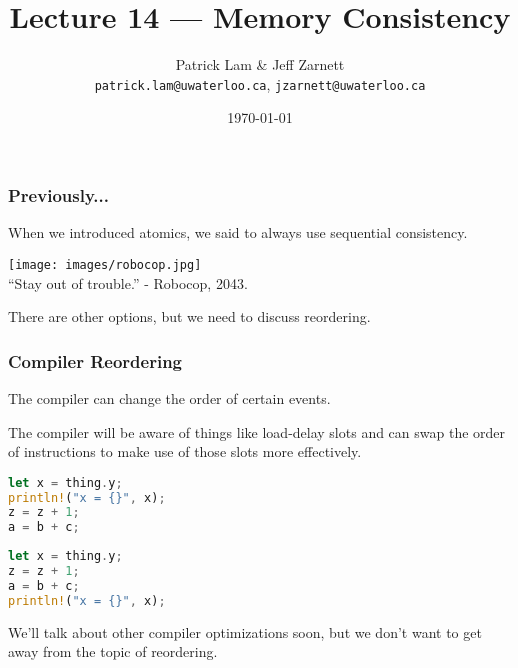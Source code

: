 


\title{Lecture 14 --- Memory Consistency}

\author{Patrick Lam \& Jeff Zarnett\\ \small \texttt{patrick.lam@uwaterloo.ca}, \texttt{jzarnett@uwaterloo.ca}}
\date{\today}




\begin{frame}
  \titlepage
 \end{frame}
 
 
\begin{frame}
\frametitle{Previously...}

When we introduced atomics, we said to always use sequential consistency.

\begin{center}
	\texttt{[image: images/robocop.jpg]}\\
	\hfill ``Stay out of trouble.'' - Robocop, 2043.
\end{center}

There are other options, but we need to discuss reordering.

\end{frame}



\begin{frame}[fragile]
\frametitle{Compiler Reordering}
The compiler can change the order of certain events. 

The compiler will be aware of things like load-delay slots and can swap the order of instructions to make use of those slots more effectively.

\begin{multicols}{2}
\begin{lstlisting}[language=Rust]
let x = thing.y;
println!("x = {}", x);
z = z + 1;
a = b + c;
\end{lstlisting}
\columnbreak
\begin{lstlisting}[language=Rust]
let x = thing.y;
z = z + 1;
a = b + c;
println!("x = {}", x);
\end{lstlisting}
\end{multicols}

We'll talk about other compiler optimizations soon, but we don't want to get away from the topic of reordering. 

\end{frame}



